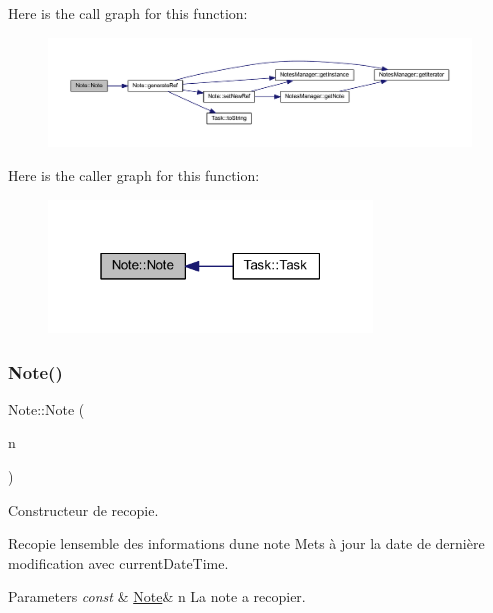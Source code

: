 Here is the call graph for this function\+:\nopagebreak
\begin{figure}[H]
\begin{center}
\leavevmode
\includegraphics[width=350pt]{class_note_a0490153115307d5f59974d7000260e48_cgraph}
\end{center}
\end{figure}
Here is the caller graph for this function\+:\nopagebreak
\begin{figure}[H]
\begin{center}
\leavevmode
\includegraphics[width=244pt]{class_note_a0490153115307d5f59974d7000260e48_icgraph}
\end{center}
\end{figure}
\mbox{\label{class_note_ac06fd282c05bbfe2e1675fe0677b2efb}} 
\subsubsection{\texorpdfstring{Note()}{Note()}\hspace{0.1cm}{\footnotesize\ttfamily [2/2]}}
{\footnotesize\ttfamily Note\+::\+Note (\begin{DoxyParamCaption}\item[{const \hyperlink{class_note}{Note} \&}]{n }\end{DoxyParamCaption})}



Constructeur de recopie. 

Recopie l\textquotesingle{}ensemble des informations d\textquotesingle{}une note Mets à jour la date de dernière modification avec current\+Date\+Time. 
\begin{DoxyParams}{Parameters}
{\em const} & \hyperlink{class_note}{Note}\& n La note a recopier. \\
\hline
\end{DoxyParams}


